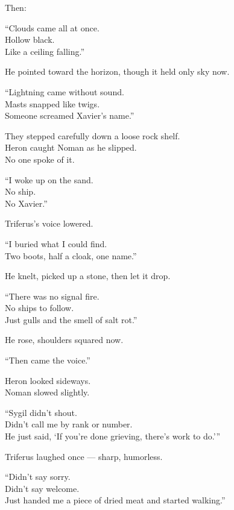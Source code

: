 \documentclass[9pt]{article}
\begin{document}
Then:

“Clouds came all at once.\\
Hollow black.\\
Like a ceiling falling.”

He pointed toward the horizon, though it held only sky now.

“Lightning came without sound.\\
Masts snapped like twigs.\\
Someone screamed Xavier’s name.”

\vspace{1em}

They stepped carefully down a loose rock shelf.\\
Heron caught Noman as he slipped.\\
No one spoke of it.

\vspace{1em}

“I woke up on the sand.\\
No ship.\\
No Xavier.”

Triferus’s voice lowered.

“I buried what I could find.\\
Two boots, half a cloak, one name.”

He knelt, picked up a stone, then let it drop.

“There was no signal fire.\\
No ships to follow.\\
Just gulls and the smell of salt rot.”

\vspace{1em}

He rose, shoulders squared now.

“Then came the voice.”

\vspace{1em}

Heron looked sideways.\\
Noman slowed slightly.

“Sygil didn’t shout.\\
Didn’t call me by rank or number.\\
He just said, ‘If you’re done grieving, there’s work to do.’”

\vspace{1em}

Triferus laughed once — sharp, humorless.

“Didn’t say sorry.\\
Didn’t say welcome.\\
Just handed me a piece of dried meat and started walking.”
\end{document}
